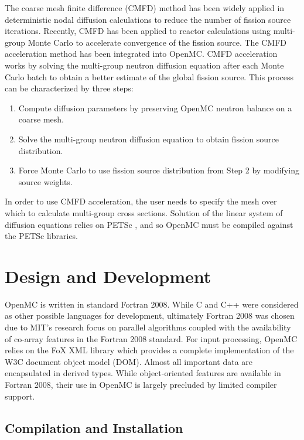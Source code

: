 \documentclass[5p,authoryear]{elsarticle}
\begin{document}
The coarse mesh finite difference (CMFD) method has been widely applied in
deterministic nodal diffusion calculations to reduce the number of fission
source iterations. Recently, CMFD has been applied to reactor calculations using
multi-group Monte Carlo \citep{physor-lee-2012} to accelerate convergence of the
fission source. The CMFD acceleration method has been integrated into
OpenMC. CMFD acceleration works by solving the multi-group neutron diffusion
equation after each Monte Carlo batch to obtain a better estimate of the global
fission source. This process can be characterized by three steps:
\begin{enumerate}
 \item Compute diffusion parameters by preserving OpenMC neutron balance on a
   coarse mesh.
 \item Solve the multi-group neutron diffusion equation to obtain fission source
   distribution.
 \item Force Monte Carlo to use fission source distribution from Step 2 by
   modifying source weights.
\end{enumerate}

In order to use CMFD acceleration, the user needs to specify the mesh over which
to calculate multi-group cross sections. Solution of the linear system of
diffusion equations relies on PETSc \citep{petsc-2013}, and so OpenMC must be
compiled against the PETSc libraries.

\section{Design and Development}

OpenMC is written in standard Fortran 2008. While C and C++ were considered as
other possible languages for development, ultimately Fortran 2008 was chosen due
to MIT's research focus on parallel algorithms coupled with the availability of
co-array features in the Fortran 2008 standard. For input processing, OpenMC
relies on the FoX XML library \citep{walker-2014} which provides a complete
implementation of the W3C document object model (DOM). Almost all important data
are encapsulated in derived types. While object-oriented features are available
in Fortran 2008, their use in OpenMC is largely precluded by limited compiler
support.

\subsection{Compilation and Installation}
\end{document}
